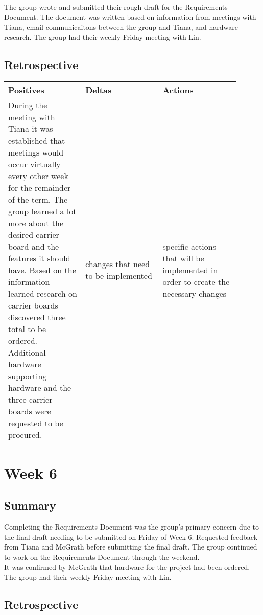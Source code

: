 \documentclass[letterpaper,10pt,serif,draftclsnofoot,onecolumn,compsoc,titlepage]{IEEEtran}
\begin{document}
The group wrote and submitted their rough draft for the Requirements Document. The 
document was written based on information from meetings with Tiana, email 
communicaitons between the group and Tiana, and hardware research.  The group had 
their weekly Friday meeting with Lin. \\

\subsection{Retrospective}

\begin{tabular}{|p{0.3\linewidth}|p{0.3\linewidth}|p{0.3\linewidth}|}
   \hline
   \textbf{Positives} & \textbf{Deltas} & \textbf{Actions}\\ 
   \hline
   During the meeting with Tiana it was established that meetings would occur virtually 
   every other week for the remainder of the term. The group learned a lot more about 
   the desired carrier board and the features it should have. Based on the information 
   learned research on carrier boards discovered three total to be ordered. Additional 
   hardware supporting hardware and the three carrier boards were requested to be 
   procured.  
   & 
   changes that need to be implemented 
   & 
   specific actions that will be implemented in order to create the necessary 
   changes \\
   \hline
\end{tabular}

\section{Week 6}

\subsection{Summary}

Completing the Requirements Document was the group's primary concern due to the 
final draft needing to be submitted on Friday of Week 6. Requested feedback 
from Tiana and McGrath before submitting the final draft. The group continued to 
work on the Requirements Document through the weekend. \\

It was confirmed by McGrath that hardware for the project had been ordered. The group 
had their weekly Friday meeting with Lin. \\

\subsection{Retrospective}
\end{document}

